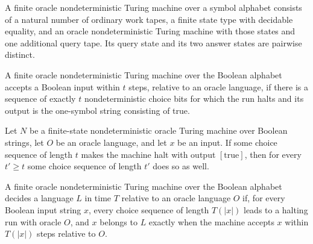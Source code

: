 \begin{definition}
\label{Turing.FinOracleNDTM}
\leanok
{}
A finite oracle nondeterministic Turing machine over a symbol alphabet consists of a
natural number of ordinary work tapes, a finite state type with decidable equality, and
an oracle nondeterministic Turing machine with those states and one additional query
tape. Its query state and its two answer states are pairwise distinct.
\end{definition}

\begin{definition}
\label{Turing.FinOracleNDTM.AcceptsWithin}
\leanok
{}
A finite oracle nondeterministic Turing machine over the Boolean alphabet accepts a
Boolean input within $t$ steps, relative to an oracle language, if there is a sequence
of exactly $t$ nondeterministic choice bits for which the run halts and its output is
the one-symbol string consisting of true.
\end{definition}

\begin{theorem}
\label{Turing.FinOracleNDTM.AcceptsWithin.mono}
\leanok
{}
Let $N$ be a finite-state nondeterministic oracle Turing machine over Boolean strings,
let $O$ be an oracle language, and let $x$ be an input. If some choice sequence of
length $t$ makes the machine halt with output $[\mathrm{true}]$, then for every $t' \ge
t$ some choice sequence of length $t'$ does so as well.
\end{theorem}

\begin{definition}
\label{Turing.FinOracleNDTM.DecidesInTime}
\leanok
{}
A finite oracle nondeterministic Turing machine over the Boolean alphabet decides a
language $L$ in time $T$ relative to an oracle language $O$ if, for every Boolean input
string $x$, every choice sequence of length $T(|x|)$ leads to a halting run with oracle
$O$, and $x$ belongs to $L$ exactly when the machine accepts $x$ within $T(|x|)$ steps
relative to $O$.
\end{definition}

